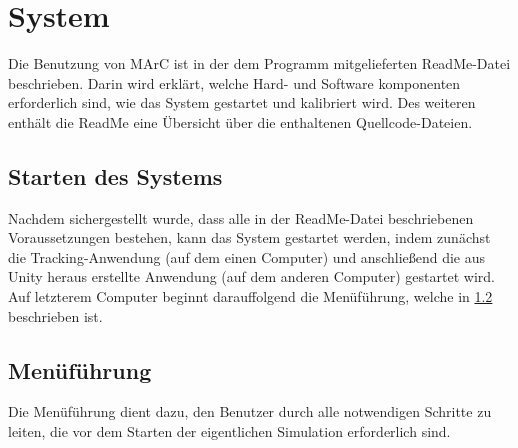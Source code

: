 \section{System}
Die Benutzung von MArC ist in der dem Programm mitgelieferten ReadMe-Datei beschrieben. Darin wird erklärt, welche Hard- und Software komponenten erforderlich sind, wie das System gestartet und kalibriert wird. Des weiteren enthält die ReadMe eine Übersicht über die enthaltenen Quellcode-Dateien.
\subsection{Starten des Systems}
Nachdem sichergestellt wurde, dass alle in der ReadMe-Datei beschriebenen Voraussetzungen bestehen, kann das System gestartet werden, indem zunächst die Tracking-Anwendung (auf dem einen Computer) und anschließend die aus Unity heraus erstellte Anwendung (auf dem anderen Computer) gestartet wird. Auf letzterem Computer beginnt darauffolgend die Menüführung, welche in \ref{sec:menu} beschrieben ist. 
\subsection{Menüführung}\label{sec:menu}
Die Menüführung dient dazu, den Benutzer durch alle notwendigen Schritte zu leiten, die vor dem Starten der eigentlichen Simulation erforderlich sind.

